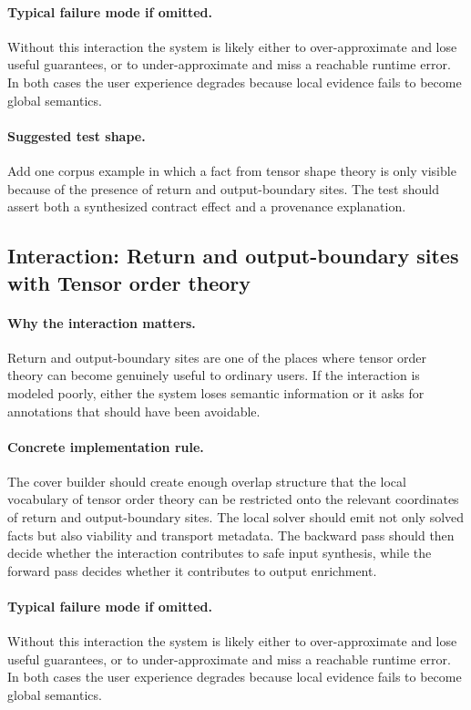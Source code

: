 \documentclass[11pt]{report}
\theoremstyle{definition}
\theoremstyle{plain}
\begin{document}
\paragraph{Typical failure mode if omitted.}
Without this interaction the system is likely either to over-approximate and
lose useful guarantees, or to under-approximate and miss a reachable runtime
error. In both cases the user experience degrades because local evidence
fails to become global semantics.

\paragraph{Suggested test shape.}
Add one corpus example in which a fact from tensor shape theory is only
visible because of the presence of return and output-boundary sites. The test should
assert both a synthesized contract effect and a provenance explanation.

\subsection{Interaction: Return and output-boundary sites with Tensor order theory}

\paragraph{Why the interaction matters.}
Return and output-boundary sites are one of the places where tensor order theory can become
genuinely useful to ordinary users. If the interaction is modeled poorly,
either the system loses semantic information or it asks for annotations that
should have been avoidable.

\paragraph{Concrete implementation rule.}
The cover builder should create enough overlap structure that the local
vocabulary of tensor order theory can be restricted onto the relevant
coordinates of return and output-boundary sites. The local solver should emit not only
solved facts but also viability and transport metadata. The backward pass
should then decide whether the interaction contributes to safe input
synthesis, while the forward pass decides whether it contributes to output
enrichment.

\paragraph{Typical failure mode if omitted.}
Without this interaction the system is likely either to over-approximate and
lose useful guarantees, or to under-approximate and miss a reachable runtime
error. In both cases the user experience degrades because local evidence
fails to become global semantics.
\end{document}
